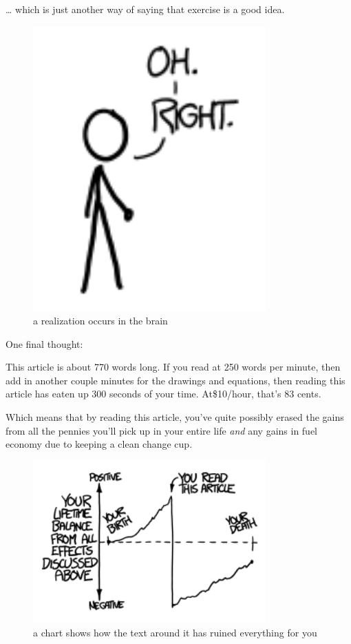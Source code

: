 {… which is just another way of saying that exercise is a good idea.}

\begin{figure}[!htbp]
\centering
\includegraphics[scale=0.5, max width=0.8\textwidth]{imgs/a/22/pennies_right.png}
\caption{a realization occurs in the brain}
\end{figure}

{One final thought:}

{This article is about 770 words long. If you read at 250 words per minute, then add in another couple minutes for the drawings and equations, then reading this article has eaten up 300 seconds of your time. At\$10/hour, that’s 83 cents.}

{Which means that by reading this article, you’ve quite possibly erased the gains from all the pennies you’ll pick up in your entire life \emph{and} any gains in fuel economy due to keeping a clean change cup.}

\begin{figure}[!htbp]
\centering
\includegraphics[scale=0.5, max width=0.8\textwidth]{imgs/a/22/pennies_oops.png}
\caption{a chart shows how the text around it has ruined everything for you}
\end{figure}

